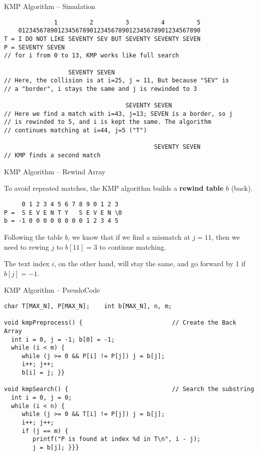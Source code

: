 \begin{frame}[fragile]{KMP Algorithm -- Simulation}

{\smaller
\begin{verbatim}
              1         2         3         4         5
    012345678901234567890123456789012345678901234567890
T = I DO NOT LIKE SEVENTY SEV BUT SEVENTY SEVENTY SEVEN
P = SEVENTY SEVEN
// for i from 0 to 13, KMP works like full search

                  SEVENTY SEVEN
// Here, the collision is at i=25, j = 11, But because "SEV" is
// a "border", i stays the same and j is rewinded to 3

                                  SEVENTY SEVEN
// Here we find a match with i=43, j=13; SEVEN is a border, so j
// is rewinded to 5, and i is kept the same. The algorithm
// continues matching at i=44, j=5 ("T")

                                          SEVENTY SEVEN
// KMP finds a second match
\end{verbatim}}

\end{frame}


\begin{frame}[fragile]{KMP Algorithm -- Rewind Array}

\begin{block}{}
To avoid repeated matches, the KMP algorithm builds a {\bf rewind table} $b$ (back).

\begin{verbatim}
     0 1 2 3 4 5 6 7 8 9 0 1 2 3
P =  S E V E N T Y   S E V E N \0
b = -1 0 0 0 0 0 0 0 0 1 2 3 4 5
\end{verbatim}

Following the table $b$, we know that if we find a mismatch at $j = 11$, then we need to rewing $j$ to $b[11] = 3$ to continue matching.\bigskip

The text index $i$, on the other hand, will stay the same, and go forward by 1 if $b[j] = -1$.
    \end{block}
\end{frame}

\begin{frame}[fragile]{KMP Algorithm -- PseudoCode}

  {\smaller
  \begin{exampleblock}{}
\begin{verbatim}
char T[MAX_N], P[MAX_N];    int b[MAX_N], n, m;

void kmpPreprocess() {                         // Create the Back Array
  int i = 0, j = -1; b[0] = -1;
  while (i < m) {
     while (j >= 0 && P[i] != P[j]) j = b[j];
     i++; j++;
     b[i] = j; }}

void kmpSearch() {                             // Search the substring
  int i = 0, j = 0;
  while (i < n) {
     while (j >= 0 && T[i] != P[j]) j = b[j];
     i++; j++;
     if (j == m) {
        printf("P is found at index %d in T\n", i - j);
        j = b[j]; }}}
\end{verbatim}
  \end{exampleblock}
  }
\end{frame}

